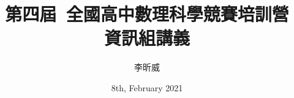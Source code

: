 \documentclass[notitlepage,12pt,a4paper]{report}
\begin{document}
\setcounter{tocdepth}{0}
\title{第四屆\, 全國高中數理科學競賽培訓營 
\\資訊組講義}
\author{李昕威}
\date{8th, February 2021}

\maketitle
\let\oldmaketitle\maketitle
\setcounter{chapter}{0}
\renewcommand{\maketitle}{%
  \oldmaketitle
  \addtocounter{chapter}{1}
  \addcontentsline{toc}{chapter}{\protect\numberline{\thechapter}\bf{\thetitle}}%
  \resetcounters
}



\newpage

\setcounter{tocdepth}{5}
\tableofcontents

\newpage


\end{document}
